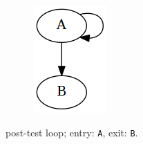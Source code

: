 \begin{figure}[htbp]
\begin{subfigure}[ht]{0.30\textwidth}
\begin{subfigure}[ht]{0.35\textwidth}
			\includegraphics[width=\textwidth]{inc/primitives/post_loop.png}
		\end{subfigure}
		\caption{post-test loop; entry: \texttt{A}, exit: \texttt{B}.}
	\end{subfigure}
	\qquad
	\begin{subfigure}[ht]{0.24\textwidth}
		\centering
		\begin{subfigure}[ht]{0.20\textwidth}
			
		\end{subfigure}
		\begin{subfigure}[ht]{0.35\textwidth}

\end{subfigure}
\end{subfigure}
\end{figure}
